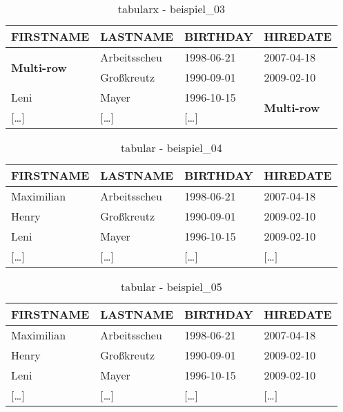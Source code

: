 \begin{table}[H]
  \ttfamily
  \begin{tabularx}{\textwidth}{X|X|X|X}
    \textbf{FIRSTNAME} & \textbf{LASTNAME} & \textbf{BIRTHDAY} & \textbf{HIREDATE} \\
    \hline\hline
    \multirow{2}{*}{\textbf{Multi-row}} & Arbeitsscheu & 1998-06-21 & 2007-04-18 \\
    & Großkreutz & 1990-09-01 & 2009-02-10 \\
    Leni & Mayer & 1996-10-15 & \multirow{2}{*}{\textbf{Multi-row}} \\
    $[$\dots$]$ & $[$\dots$]$ & $[$\dots$]$ & \\
    \hline
  \end{tabularx}
  \caption{tabularx - beispiel\_03}
  \label{tbl:beispiel_03}
\end{table}


\begin{table}[H]
  \ttfamily
  \begin{tabular}{l|l|l|l}
    \cellcolor{light-grey} \textbf{FIRSTNAME} & \textbf{LASTNAME} & \textbf{BIRTHDAY} & \cellcolor{grey} \textbf{HIREDATE} \\
    \hline\hline
    Maximilian & Arbeitsscheu & \cellcolor{orange}1998-06-21 & 2007-04-18 \\
    Henry & \cellcolor{red} Großkreutz & 1990-09-01 & 2009-02-10 \\
    \cellcolor{green} Leni & Mayer & 1996-10-15 & \cellcolor{blue} 2009-02-10 \\
    $[$\dots$]$ & \cellcolor{yellow} $[$\dots$]$ & \cellcolor{brown} $[$\dots$]$ & $[$\dots$]$ \\
  \end{tabular}
  \caption{tabular - beispiel\_04}
  \label{tbl:beispiel_04}
\end{table}


\begin{table}[H]
  \begin{tabular}{llll}
    \toprule[2pt]
    \cellcolor{light-grey} \textbf{FIRSTNAME} & \textbf{LASTNAME} & \textbf{BIRTHDAY} & \cellcolor{grey} \textbf{HIREDATE} \\ \midrule[1.5pt]
    Maximilian & Arbeitsscheu & \cellcolor{orange}1998-06-21 & 2007-04-18 \\ \midrule
    Henry & \cellcolor{red} Großkreutz & 1990-09-01 & 2009-02-10 \\ \midrule
    \cellcolor{green} Leni & Mayer & 1996-10-15 & \cellcolor{blue} 2009-02-10 \\ \midrule
    $[$\dots$]$ & \cellcolor{yellow} $[$\dots$]$ & \cellcolor{brown} $[$\dots$]$ & $[$\dots$]$ \\
    \bottomrule
  \end{tabular}
  \caption{tabular - beispiel\_05}
  \label{tbl:beispiel_05}
\end{table}
